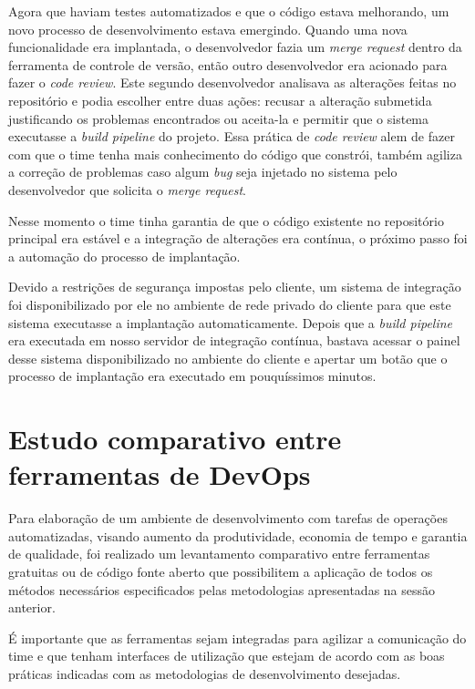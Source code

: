 \documentclass[
	12pt,				%
	openright,			%
	oneside,			%
	a4paper,			%
	english,			%
	french,				%
	spanish,			%
	brazil,				%
	]{abntex2}
\begin{document}
Agora que haviam testes automatizados e que o código estava melhorando, um novo processo de desenvolvimento estava emergindo. Quando uma nova funcionalidade era implantada, o desenvolvedor fazia um \textit{merge request} dentro da ferramenta de controle de versão, então outro desenvolvedor era acionado para fazer o \textit{code review}. Este segundo desenvolvedor analisava as alterações feitas no repositório e podia escolher entre duas ações: recusar a alteração submetida justificando os problemas encontrados ou aceita-la e permitir que o sistema executasse a \textit{build pipeline} do projeto. Essa prática de \textit{code review} alem de fazer com que o time tenha mais conhecimento do código que constrói, também agiliza a correção de problemas caso algum \textit{bug} seja injetado no sistema pelo desenvolvedor que solicita o \textit{merge request}.

Nesse momento o time tinha garantia de que o código existente no repositório principal era estável e a integração de alterações era contínua, o próximo passo foi a automação do processo de implantação.

Devido a restrições de segurança impostas pelo cliente, um sistema de integração foi disponibilizado por ele no ambiente de rede privado do cliente para que este sistema executasse a implantação automaticamente. Depois que a \textit{build pipeline} era executada em nosso servidor de integração contínua, bastava acessar o painel desse sistema disponibilizado no ambiente do cliente e apertar um botão que o processo de implantação era executado em pouquíssimos minutos.

\section{Estudo comparativo entre ferramentas de DevOps}

Para elaboração de um ambiente de desenvolvimento com tarefas de operações automatizadas, visando aumento da produtividade, economia de tempo e garantia de qualidade, foi realizado um levantamento comparativo entre ferramentas gratuitas ou de código fonte aberto que possibilitem a aplicação de todos os métodos necessários especificados pelas metodologias apresentadas na sessão anterior.

É importante que as ferramentas sejam integradas para agilizar a comunicação do time e que tenham interfaces de utilização que estejam de acordo com as boas práticas indicadas com as metodologias de desenvolvimento desejadas.
\end{document}
